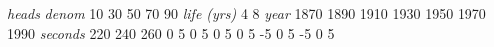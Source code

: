 \documentclass{book}
\begin{document}
\mpxshipout%
{}%
\stopmpxshipout
\mpxshipout%
{}%
\stopmpxshipout
\mpxshipout%
{}%
\stopmpxshipout
\mpxshipout%
{\small \textit{heads}}%
\stopmpxshipout
\mpxshipout%
{}%
\stopmpxshipout
\mpxshipout%
{}%
\stopmpxshipout
\mpxshipout%
{\small \textit{denom}}%
\stopmpxshipout
\mpxshipout%
{\tiny 10}%
\stopmpxshipout
\mpxshipout%
{\tiny 30}%
\stopmpxshipout
\mpxshipout%
{\tiny 50}%
\stopmpxshipout
\mpxshipout%
{\tiny 70}%
\stopmpxshipout
\mpxshipout%
{\tiny 90}%
\stopmpxshipout
\mpxshipout%
{\small \textit{life (yrs)}}%
\stopmpxshipout
\mpxshipout%
{\tiny 4}%
\stopmpxshipout
\mpxshipout%
{\tiny 8}%
\stopmpxshipout
\mpxshipout%
{\small \textit{year}}%
\stopmpxshipout
\mpxshipout%
{\small 1870}%
\stopmpxshipout
\mpxshipout%
{\small 1890}%
\stopmpxshipout
\mpxshipout%
{\small 1910}%
\stopmpxshipout
\mpxshipout%
{\small 1930}%
\stopmpxshipout
\mpxshipout%
{\small 1950}%
\stopmpxshipout
\mpxshipout%
{\small 1970}%
\stopmpxshipout
\mpxshipout%
{\small 1990}%
\stopmpxshipout
\mpxshipout%
{\small \textit{seconds}}%
\stopmpxshipout
\mpxshipout%
{\small 220}%
\stopmpxshipout
\mpxshipout%
{\small 240}%
\stopmpxshipout
\mpxshipout%
{\small 260}%
\stopmpxshipout
\mpxshipout%
{\tiny 0}%
\stopmpxshipout
\mpxshipout%
{\tiny 5}%
\stopmpxshipout
\mpxshipout%
{\tiny 0}%
\stopmpxshipout
\mpxshipout%
{\tiny 5}%
\stopmpxshipout
\mpxshipout%
{\tiny 0}%
\stopmpxshipout
\mpxshipout%
{\tiny 5}%
\stopmpxshipout
\mpxshipout%
{\tiny 0}%
\stopmpxshipout
\mpxshipout%
{\tiny 5}%
\stopmpxshipout
\mpxshipout%
{\tiny -5}%
\stopmpxshipout
\mpxshipout%
{\tiny 0}%
\stopmpxshipout
\mpxshipout%
{\tiny 5}%
\stopmpxshipout
\mpxshipout%
{\tiny -5}%
\stopmpxshipout
\mpxshipout%
{\tiny 0}%
\stopmpxshipout
\mpxshipout%
{\tiny 5}%
\stopmpxshipout
\mpxshipout%
\end{document}
